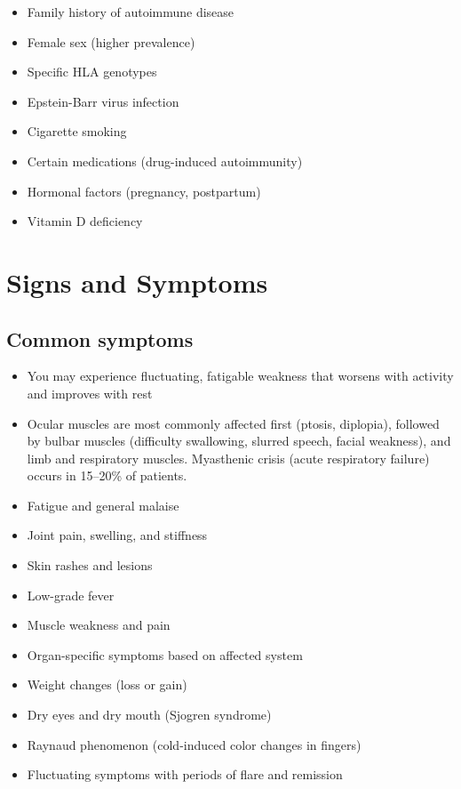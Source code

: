 \begin{itemize}[noitemsep]
  \item Family history of autoimmune disease
  \item Female sex (higher prevalence)
  \item Specific HLA genotypes
  \item Epstein-Barr virus infection
  \item Cigarette smoking
  \item Certain medications (drug-induced autoimmunity)
  \item Hormonal factors (pregnancy, postpartum)
  \item Vitamin D deficiency
\end{itemize}
\section{Signs and Symptoms}

\subsection{Common symptoms}
\begin{itemize}[noitemsep]
  \item You may experience fluctuating, fatigable weakness that worsens with activity and improves with rest
  \item Ocular muscles are most commonly affected first (ptosis, diplopia), followed by bulbar muscles (difficulty swallowing, slurred speech, facial weakness), and limb and respiratory muscles. Myasthenic crisis (acute respiratory failure) occurs in 15--20\% of patients.
  \item Fatigue and general malaise
  \item Joint pain, swelling, and stiffness
  \item Skin rashes and lesions
  \item Low-grade fever
  \item Muscle weakness and pain
  \item Organ-specific symptoms based on affected system
  \item Weight changes (loss or gain)
  \item Dry eyes and dry mouth (Sjogren syndrome)
  \item Raynaud phenomenon (cold-induced color changes in fingers)
  \item Fluctuating symptoms with periods of flare and remission
\end{itemize}

